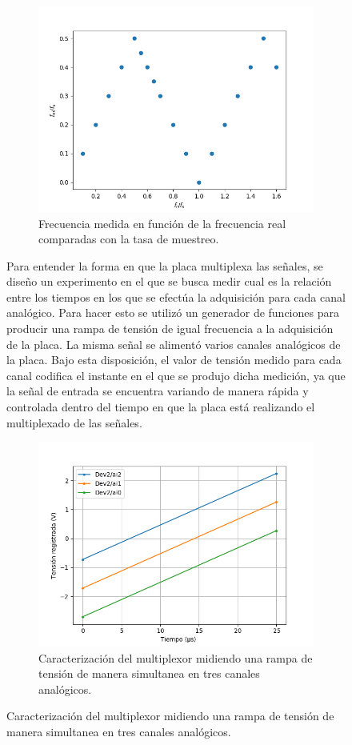 \documentclass[a4paper,11pt]{article}
\begin{document}
\begin{figure}[!ht]
\begin{figure}[!ht]
\centering
\includegraphics[width=\textwidth]{figs/alliasing.png}
\caption{Frecuencia medida en función de la frecuencia real comparadas con la tasa de muestreo.}
\label{fig:aliasing}
\end{figure}

Para entender la forma en que la placa multiplexa las señales, se diseño un experimento en el que se busca medir cual es la relación entre los tiempos en los que se efectúa la adquisición para cada canal analógico. Para hacer esto se utilizó un generador de funciones para producir una rampa de tensión de igual frecuencia a la adquisición de la placa. La misma señal se alimentó varios canales analógicos de la placa. Bajo esta disposición, el valor de tensión medido para cada canal codifica el instante en el que se produjo dicha medición, ya que la señal de entrada se encuentra variando de manera rápida y controlada dentro del tiempo en que la placa está realizando el multiplexado de las señales. 

\begin{figure}[!ht]
\centering
\includegraphics[width=\textwidth]{figs/multiplex.png}
\caption{Caracterización del multiplexor midiendo una rampa de tensión de manera simultanea en tres canales analógicos.}
\label{fig:multiplex}
\end{figure}



\end{figure}
\end{document}
